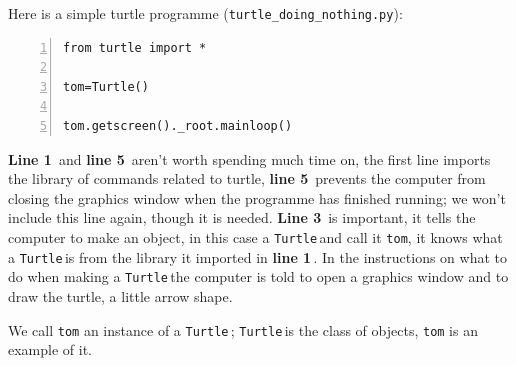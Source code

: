 \documentclass[11pt,a4paper]{scrartcl}
\newcommand{\turtle}{\texttt{Turtle}\,}
\newcommand{\lnn}[1]{\textbf{line #1}\,}
\newcommand{\Lnn}[1]{\textbf{Line #1}\,}
\begin{document}
Here is a simple turtle programme (\texttt{turtle\_doing\_nothing.py}):
\begin{lstlisting}[numbers=left]
from turtle import *

tom=Turtle()

tom.getscreen()._root.mainloop()
\end{lstlisting}
\Lnn{1} and \lnn{5} aren't worth spending much time on, the first line
imports the library of commands related to turtle, \lnn{5} prevents
the computer from closing the graphics window when the programme has
finished running; we won't include this line again, though it is
needed. \Lnn{3} is important, it tells the computer to make an object,
in this case a \turtle and call it \texttt{tom}, it knows what a
\turtle is from the library it imported in \lnn{1}. In the instructions
on what to do when making a \turtle the computer is told to open a
graphics window and to draw the turtle, a little arrow shape.
\begin{center}
\end{center}
We call \texttt{tom} an instance of a \turtle; \turtle is the class of
objects, \texttt{tom} is an example of it.
\end{document}
